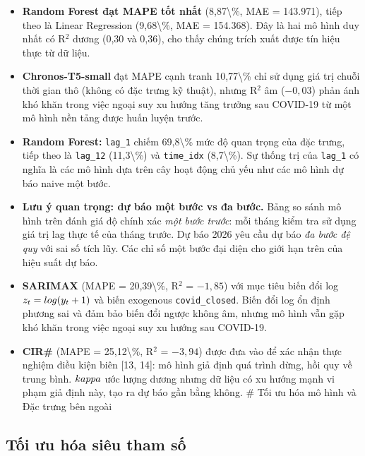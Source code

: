 \documentclass[
]{article}
\begin{document}
\begin{itemize}
\item
  \textbf{Random Forest đạt MAPE tốt nhất} (8,87\textbackslash\%, MAE =
  143.971), tiếp theo là Linear Regression (9,68\textbackslash\%, MAE =
  154.368). Đây là hai mô hình duy nhất có R\(^2\) dương (0,30 và 0,36),
  cho thấy chúng trích xuất được tín hiệu thực từ dữ liệu.
\item
  \textbf{Chronos-T5-small} đạt MAPE cạnh tranh 10,77\textbackslash\%
  chỉ sử dụng giá trị chuỗi thời gian thô (không có đặc trưng kỹ thuật),
  nhưng R\(^2\) âm (\(-0,03\)) phản ánh khó khăn trong việc ngoại suy xu
  hướng tăng trưởng sau COVID-19 từ một mô hình nền tảng được huấn luyện
  trước.
\item
  \textbf{Random Forest:} \texttt{lag\_1} chiếm 69,8\textbackslash\% mức
  độ quan trọng của đặc trưng, tiếp theo là \texttt{lag\_12}
  (11,3\textbackslash\%) và \texttt{time\_idx} (8,7\textbackslash\%). Sự
  thống trị của \texttt{lag\_1} có nghĩa là các mô hình dựa trên cây
  hoạt động chủ yếu như các mô hình dự báo naive một bước.
\item
  \textbf{Lưu ý quan trọng: dự báo một bước vs đa bước.} Bảng so sánh mô
  hình trên đánh giá độ chính xác \emph{một bước trước}: mỗi tháng kiểm
  tra sử dụng giá trị lag thực tế của tháng trước. Dự báo 2026 yêu cầu
  dự báo \emph{đa bước đệ quy} với sai số tích lũy. Các chỉ số một bước
  đại diện cho giới hạn trên của hiệu suất dự báo.
\item
  \textbf{SARIMAX} (MAPE = 20,39\textbackslash\%, R\(^2\) = \(-1,85\))
  với mục tiêu biến đổi log \(z_t = \\log(y_t+1)\) và biến exogenous
  \texttt{covid\_closed}. Biến đổi log ổn định phương sai và đảm bảo
  biến đổi ngược không âm, nhưng mô hình vẫn gặp khó khăn trong việc
  ngoại suy xu hướng sau COVID-19.
\item
  \textbf{CIR\#} (MAPE = 25,12\textbackslash\%, R\(^2\) = \(-3,94\))
  được đưa vào để xác nhận thực nghiệm điều kiện biên {[}13, 14{]}: mô
  hình giả định quá trình dừng, hồi quy về trung bình. \(\\kappa\) ước
  lượng dương nhưng dữ liệu có xu hướng mạnh vi phạm giả định này, tạo
  ra dự báo gần bằng không. \# Tối ưu hóa mô hình và Đặc trưng bên ngoài
\end{itemize}

\subsection{Tối ưu hóa siêu tham
số}\label{tux1ed1i-ux1b0u-huxf3a-siuxeau-tham-sux1ed1}
\end{document}
